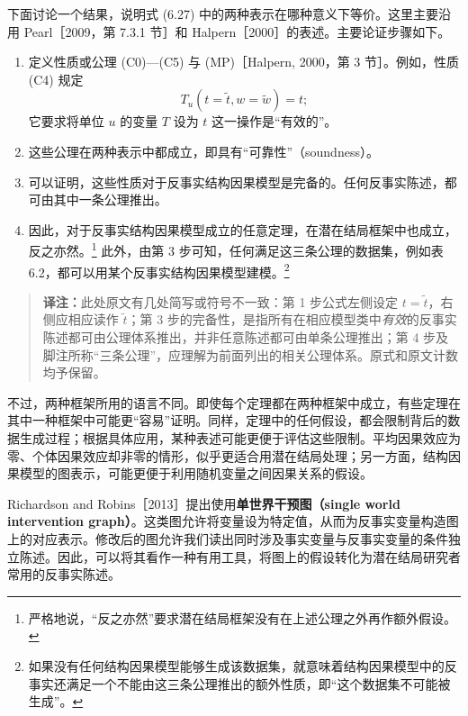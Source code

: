 下面讨论一个结果，说明式 (6.27) 中的两种表示在哪种意义下等价。这里主要沿用 Pearl［2009，第 7.3.1 节］和 Halpern［2000］的表述。主要论证步骤如下。
\begin{enumerate}[label=\arabic*.]
 \item 定义性质或公理 (C0)—(C5) 与 (MP)［Halpern, 2000，第 3 节］。例如，性质 (C4) 规定
 \[
 T_u(t=\widetilde t,w=\widetilde w)=t;
 \]
 它要求将单位 $u$ 的变量 $T$ 设为 $t$ 这一操作是“有效的”。
 \item 这些公理在两种表示中都成立，即具有“可靠性”（soundness）。
 \item 可以证明，这些性质对于反事实结构因果模型是完备的。任何反事实陈述，都可由其中一条公理推出。
 \item 因此，对于反事实结构因果模型成立的任意定理，在潜在结局框架中也成立，反之亦然。\footnote{严格地说，“反之亦然”要求潜在结局框架没有在上述公理之外再作额外假设。}
 此外，由第 3 步可知，任何满足这三条公理的数据集，例如表 6.2，都可以用某个反事实结构因果模型建模。\footnote{如果没有任何结构因果模型能够生成该数据集，就意味着结构因果模型中的反事实还满足一个不能由这三条公理推出的额外性质，即“这个数据集不可能被生成”。}
\end{enumerate}
\begin{quote}\small
\textbf{译注：}此处原文有几处简写或符号不一致：第 1 步公式左侧设定 $t=\widetilde t$，右侧应相应读作 $\widetilde t$；第 3 步的完备性，是指所有在相应模型类中\emph{有效}的反事实陈述都可由公理体系推出，并非任意陈述都可由单条公理推出；第 4 步及脚注所称“三条公理”，应理解为前面列出的相关公理体系。原式和原文计数均予保留。
\end{quote}

不过，两种框架所用的语言不同。即使每个定理都在两种框架中成立，有些定理在其中一种框架中可能更“容易”证明。同样，定理中的任何假设，都会限制背后的数据生成过程；根据具体应用，某种表述可能更便于评估这些限制。平均因果效应为零、个体因果效应却非零的情形，似乎更适合用潜在结局处理；另一方面，结构因果模型的图表示，可能更便于利用随机变量之间因果关系的假设。

Richardson and Robins［2013］提出使用\textbf{单世界干预图（single world intervention graph）}。这类图允许将变量设为特定值，从而为反事实变量构造图上的对应表示。修改后的图允许我们读出同时涉及事实变量与反事实变量的条件独立陈述。因此，可以将其看作一种有用工具，将图上的假设转化为潜在结局研究者常用的反事实陈述。
\FloatBarrier
